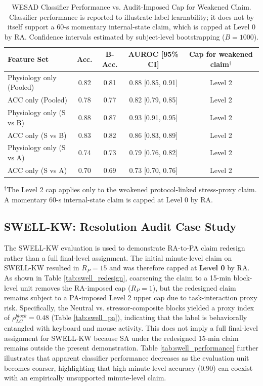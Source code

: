 \documentclass[journal]{IEEEtran}
\begin{document}
\begin{table}[t!]
\caption{WESAD Classifier Performance vs. Audit-Imposed Cap for Weakened Claim. Classifier performance is reported to illustrate label learnability; it does not by itself support a 60-s momentary internal-state claim, which is capped at Level 0 by RA. Confidence intervals estimated by subject-level bootstrapping ($B=1000$).}
\label{tab:wesad_performance}
\centering
\begin{tabular}{@{}lcccc@{}}
\toprule
\textbf{Feature Set} & \textbf{Acc.} & \textbf{B-Acc.} & \textbf{AUROC [95\% CI]} & \textbf{Cap for weakened claim$^\dagger$} \\
\midrule
Physiology only (Pooled)  & 0.82 & 0.81 & 0.88 [0.85, 0.91] & Level 2 \\
ACC only (Pooled)         & 0.78 & 0.77 & 0.82 [0.79, 0.85] & Level 2 \\
Physiology only (S vs B)  & 0.88 & 0.87 & 0.93 [0.91, 0.95] & Level 2 \\
ACC only (S vs B)         & 0.83 & 0.82 & 0.86 [0.83, 0.89] & Level 2 \\
Physiology only (S vs A)  & 0.74 & 0.73 & 0.79 [0.76, 0.82] & Level 2 \\
ACC only (S vs A)         & 0.70 & 0.69 & 0.73 [0.70, 0.76] & Level 2 \\
\bottomrule
\end{tabular}
\smallskip
\begin{minipage}{\textwidth}
\small $^\dagger$The Level 2 cap applies only to the weakened protocol-linked stress-proxy claim. A momentary 60-s internal-state claim is capped at Level 0 by RA.
\end{minipage}
\end{table}

\subsection{SWELL-KW: Resolution Audit Case Study}
The SWELL-KW evaluation is used to demonstrate RA-to-PA claim redesign rather than a full final-level assignment. The initial minute-level claim on SWELL-KW resulted in $R_P = 15$ and was therefore capped at \textbf{Level 0} by RA. As shown in Table \ref{tab:swell_redesign}, coarsening the claim to a 15-min block-level unit removes the RA-imposed cap ($R_P = 1$), but the redesigned claim remains subject to a PA-imposed Level 2 upper cap due to task-interaction proxy risk. Specifically, the Neutral vs. stressor-composite blocks yielded a proxy index of $\rho^{block}_{LC}=0.48$ (Table \ref{tab:swell_pa}), indicating that the label is behaviorally entangled with keyboard and mouse activity. This does not imply a full final-level assignment for SWELL-KW because SA under the redesigned 15-min claim remains outside the present demonstration. Table \ref{tab:swell_performance} further illustrates that apparent classifier performance decreases as the evaluation unit becomes coarser, highlighting that high minute-level accuracy ($0.90$) can coexist with an empirically unsupported minute-level claim.
\enlargethispage{1\baselineskip}
\end{document}
